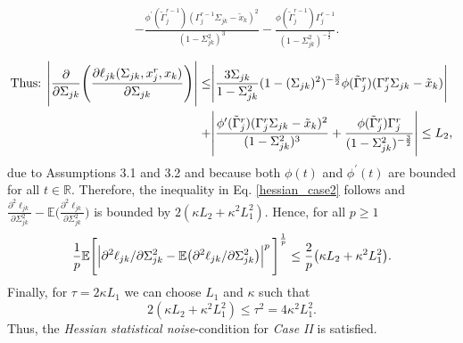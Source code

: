 \begin{condition}
\begin{multline}
\begin{aligned}
             & -  \frac{\phi^\prime({\tilde{\Gamma}}_j^{r-1})({\Gamma}_j^{r-1}\Sigma_{jk} - {\tilde{x}}_{k})^2}{(1-\Sigma_{jk}^2)^3} - \frac{\phi({\tilde{\Gamma}}_j^{r-1}){\Gamma}_j^{r-1}}{(1-\Sigma_{jk}^2)^{-\frac{3}{2}}}.
        \end{aligned}
    \end{multline}
    \begin{equation*}
        \begin{split}
            \text{Thus: } \abs{\frac{\partial}{\partial \Sigma_{jk}} \Bigg(\frac{\partial\ell_{jk}(\Sigma_{jk}, x_j^r,x_k)}{\partial \Sigma_{jk}}\Bigg)} \leq &\abs{\frac{3\Sigma_{jk}}{1-\Sigma_{jk}^2} (1-(\Sigma_{jk})^2)^{-\frac{3}{2}} \phi({\tilde{\Gamma}}_j^{r})({\Gamma}_j^r\Sigma_{jk} - {\tilde{x}}_{k})} \\
            + &\abs{\frac{\phi^\prime({\tilde{\Gamma}}_j^{r})({\Gamma}_j^r\Sigma_{jk} - {\tilde{x}}_{k})^2}{(1-\Sigma_{jk}^2)^3} + \frac{\phi({\tilde{\Gamma}}_j^{r}){\Gamma}_j^{r}}{(1-\Sigma_{jk}^2)^{-\frac{3}{2}}}} \leq L_2,
        \end{split}
    \end{equation*}
    due to Assumptions 3.1 and 3.2 %
    and because both $\phi(t)$ and $\phi^{\prime}(t)$ are bounded for all $t\in\mathbb{R}$. Therefore, the inequality in Eq. \eqref{hessian_case2} follows and $\frac{\partial^2\ell_{jk}}{\partial \Sigma_{jk}^{2}} - \mathbb{E}\bigg(\frac{\partial^2\ell_{jk}}{\partial \Sigma_{jk}^{2}}\bigg)$ is bounded by $2(\kappa L_2 + \kappa^2 L_1^2)$. Hence, for all $p\geq1$
    \begin{equation}
        \frac{1}{p}\mathbb{E}\Bigg[\abs{\partial^2\ell_{jk}/\partial \Sigma_{jk}^{2} - \mathbb{E}\big(\partial^2\ell_{jk}/\partial \Sigma_{jk}^{2}\big)}^p\Bigg]^{\frac{1}{p}} \leq \frac{2}{p}\big(\kappa L_2 + \kappa^2 L_1^2\big).
    \end{equation}
    Finally, for $\tau = 2\kappa L_1$ we can choose $L_1$ and $\kappa$ such that \[2(\kappa L_2 + \kappa^2 L_1^2) \leq \tau^2 = 4\kappa^2 L_1^2.\] Thus, the \textit{Hessian statistical noise}-condition for \textit{Case II} is satisfied.


\end{condition}
